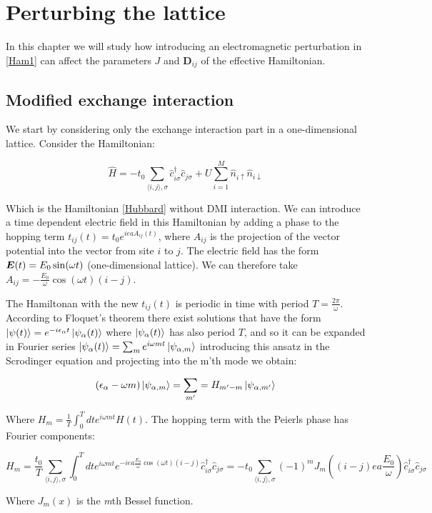 \chapter{Perturbing the lattice}

In this chapter we will study how introducing an electromagnetic perturbation in \ref{Ham1} can affect the parameters $J$ and $\boldsymbol{D}_{ij}$ of the effective Hamiltonian. 

\section{Modified exchange interaction}

We start by considering only the exchange interaction part in a one-dimensional lattice. Consider the Hamiltonian:

\begin{equation}
\hat{H} = -t_0\sum_{\langle i,j \rangle, \sigma} \hat{c}_{i \sigma}^\dagger \hat{c}_{j \sigma} + U \sum_{i=1}^M \hat{n}_{i\uparrow}\hat{n}_{i\downarrow}
\end{equation}

Which is the Hamiltonian \ref{Hubbard} without DMI interaction. We can introduce a time dependent electric field in this Hamiltonian by adding a phase to the hopping term $t_{ij}(t) = t_0e^{ieaA_{ij}(t)}$, where $A_{ij}$ is the projection of the vector potential into the vector from site $i$ to $j$. The electric field has the form $\boldsymbol{E}(t) = E_0 \sin (\omega t)$ (one-dimensional lattice). We can therefore take $A_{ij} = -\frac{E_0}{\omega}\cos(\omega t)(i-j)$.

The Hamiltonan with the new $t_{ij}(t)$ is periodic in time with period $T=\frac{2\pi}{\omega}$. According to Floquet's theorem there exist solutions that have the form $\ket{\psi(t)} = e^{-i \epsilon_\alpha t} \ket{\psi_\alpha (t)}$ where $\ket{\psi_\alpha(t)}$ has also period $T$, and so it can be expanded in Fourier series $\ket{\psi_\alpha(t)} = \sum_m e^{i\omega mt} \ket{\psi_{\alpha,m}}$ introducing this ansatz in the Scrodinger equation and projecting into the m'th mode we obtain:

\begin{equation}
(\epsilon_\alpha-\omega m) \ket{\psi_{\alpha, m}} = \sum_{m'} = H_{m'-m} \ket{\psi_{\alpha,m'}}
\end{equation}

Where $H_m = \frac{1}{T}\int_0^T dt e^{i\omega mt} H(t)$. The hopping term with the Peierls phase has Fourier components:

\begin{equation}
H_{m} = \frac{t_0}{T} \sum_{\langle i,j \rangle, \sigma} \int_0^T dt e^{i\omega mt} e^{-iea\frac{E_0}{\omega}\cos(\omega t)(i-j)}\hat{c}_{i\sigma}^\dagger \hat{c}_{j\sigma} = -t_0 \sum_{\langle i,j \rangle, \sigma} (-1)^mJ_m((i-j)ea\frac{E_0}{\omega})\hat{c}_{i\sigma}^\dagger \hat{c}_{j\sigma}
\end{equation}

Where $J_m(x)$ is the \textit{m}th Bessel function.